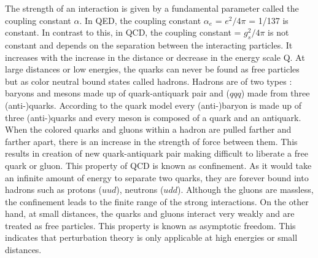 The strength of an interaction is given by a fundamental parameter called the coupling constant $\alpha$. In QED, the coupling constant $\alpha_e$ = $e^2/4\pi$ = 1/137 is constant. In contrast to this, in QCD, the coupling constant \alpsq = $g^2_s/4\pi$ is not constant and depends on the separation between the interacting particles. It increases with the increase in the distance or decrease in the energy scale Q. At large distances or low energies, the quarks can never be found as free particles but as color neutral bound states called hadrons. Hadrons are of two types : baryons and mesons made up of quark-antiquark pair and ($qqq$) made from three (anti-)quarks. According to the quark model \cite{Griffiths:111880} every (anti-)baryon is made up of three (anti-)quarks and every meson is composed of a quark and an antiquark. When the colored quarks and gluons within a hadron are pulled farther and farther apart, there is an increase in the strength of force between them. This results in creation of new quark-antiquark pair making difficult to liberate a free quark or gluon. This property of QCD is known as confinement. As it would take an infinite amount of energy to separate two quarks, they are forever bound into hadrons such as protons ($uud$), neutrons ($udd$). Although the gluons are massless, the confinement leads to the finite range of the strong interactions. On the other hand, at small distances, the quarks and gluons interact very weakly and are treated as free particles. This property is known as asymptotic freedom. This indicates that perturbation theory is only applicable at high energies or small distances.

